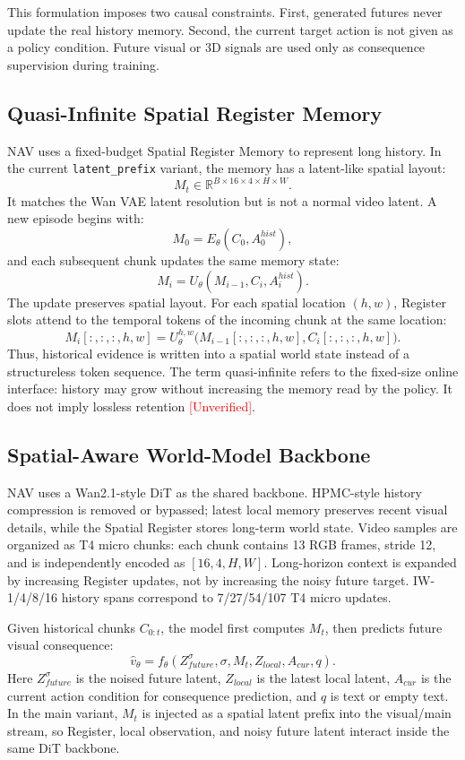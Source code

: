 \documentclass[11pt,a4paper]{ctexart}
\newcommand{\method}{NAV}
\newcommand{\reg}{Spatial Register Memory}
\newcommand{\unverified}{\textcolor{red}{[Unverified]}}
\begin{document}
This formulation imposes two causal constraints. First, generated futures never update the real history memory. Second, the current target action is not given as a policy condition. Future visual or 3D signals are used only as consequence supervision during training.

\subsection{Quasi-Infinite Spatial Register Memory}

\method{} uses a fixed-budget \reg{} to represent long history. In the current \texttt{latent\_prefix} variant, the memory has a latent-like spatial layout:
\[
M_t \in \mathbb{R}^{B \times 16 \times 4 \times H \times W}.
\]
It matches the Wan VAE latent resolution but is not a normal video latent. A new episode begins with:
\[
M_0 = E_\theta(C_0, A^{hist}_0),
\]
and each subsequent chunk updates the same memory state:
\[
M_i = U_\theta(M_{i-1}, C_i, A^{hist}_i).
\]
The update preserves spatial layout. For each spatial location \((h,w)\), Register slots attend to the temporal tokens of the incoming chunk at the same location:
\[
M_i[:, :, :, h, w] =
U_\theta^{h,w}\big(M_{i-1}[:, :, :, h, w], C_i[:, :, :, h, w]\big).
\]
Thus, historical evidence is written into a spatial world state instead of a structureless token sequence. The term quasi-infinite refers to the fixed-size online interface: history may grow without increasing the memory read by the policy. It does not imply lossless retention \unverified{}.

\subsection{Spatial-Aware World-Model Backbone}

\method{} uses a Wan2.1-style DiT as the shared backbone. HPMC-style history compression is removed or bypassed; latest local memory preserves recent visual details, while the Spatial Register stores long-term world state. Video samples are organized as T4 micro chunks: each chunk contains 13 RGB frames, stride 12, and is independently encoded as \([16,4,H,W]\). Long-horizon context is expanded by increasing Register updates, not by increasing the noisy future target. IW-1/4/8/16 history spans correspond to 7/27/54/107 T4 micro updates.

Given historical chunks \(C_{0:t}\), the model first computes \(M_t\), then predicts future visual consequence:
\[
\hat{v}_\theta =
f_\theta(Z^\sigma_{future}, \sigma, M_t, Z_{local}, A_{cur}, q).
\]
Here \(Z^\sigma_{future}\) is the noised future latent, \(Z_{local}\) is the latest local latent, \(A_{cur}\) is the current action condition for consequence prediction, and \(q\) is text or empty text. In the main variant, \(M_t\) is injected as a spatial latent prefix into the visual/main stream, so Register, local observation, and noisy future latent interact inside the same DiT backbone.
\end{document}
